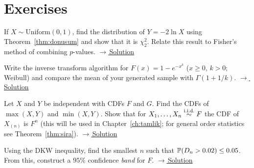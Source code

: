 \documentclass[main.tex]{subfiles}
\begin{document}
\section{Exercises}

\begin{exercise}\label{exr:02-1}
If $X\sim\text{Uniform}(0,1)$, find the distribution of $Y=-2\ln X$ using Theorem~\ref{thm:donusum} and show that it is $\chi^2_2$. Relate this result to Fisher's method of combining $p$-values.
\hfill\hyperref[coz:02-1]{\footnotesize$\rightarrow$\,Solution}
\end{exercise}

\begin{exercise}\label{exr:02-2}
Write the inverse transform algorithm for $F(x)=1-e^{-x^k}$ ($x\ge0$, $k>0$; Weibull) and compare the mean of your generated sample with $\Gamma(1+1/k)$.
\hfill\hyperref[coz:02-2]{\footnotesize$\rightarrow$\,Solution}
\end{exercise}

\begin{exercise}\label{exr:02-3}
Let $X$ and $Y$ be independent with CDFs $F$ and $G$. Find the CDFs of $\max(X,Y)$ and $\min(X,Y)$. Show that for $X_1,\dots,X_n\iid F$ the CDF of $X_{(n)}$ is $F^n$ (this will be used in Chapter~\ref{ch:tamlik}; for general order statistics see Theorem~\ref{thm:sira}).
\hfill\hyperref[coz:02-3]{\footnotesize$\rightarrow$\,Solution}
\end{exercise}

\begin{exercise}\label{exr:02-4}
Using the DKW inequality, find the smallest $n$ such that $\P(D_n>0.02)\le0.05$. From this, construct a $95\%$ confidence \emph{band} for $F$.
\hfill\hyperref[coz:02-4]{\footnotesize$\rightarrow$\,Solution}
\end{exercise}

\end{document}
